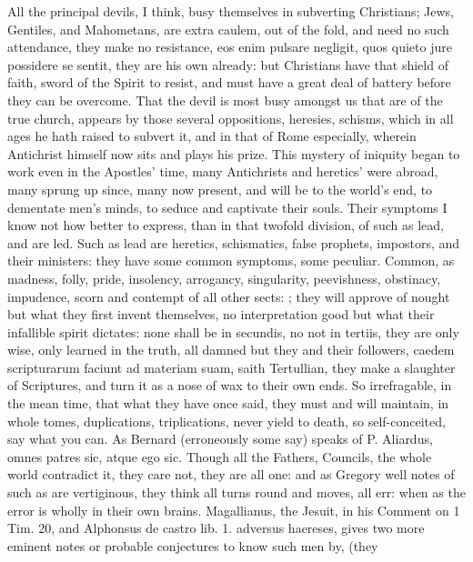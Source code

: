 {All the principal devils, I think, busy themselves in subverting
Christians; Jews, Gentiles, and Mahometans, are extra caulem, out of
the fold, and need no such attendance, they make no resistance,
eos enim pulsare negligit, quos quieto jure possidere se sentit,
they are his own already: but Christians have that shield of faith,
sword of the Spirit to resist, and must have a great deal of battery
before they can be overcome. That the devil is most busy amongst us
that are of the true church, appears by those several oppositions,
heresies, schisms, which in all ages he hath raised to subvert it, and
in that of Rome especially, wherein Antichrist himself now sits and
plays his prize. This mystery of iniquity began to work even in the
Apostles' time, many Antichrists and heretics' were abroad, many sprung
up since, many now present, and will be to the world's end, to
dementate men's minds, to seduce and captivate their souls. Their
symptoms I know not how better to express, than in that twofold
division, of such as lead, and are led. Such as lead are heretics,
schismatics, false prophets, impostors, and their ministers: they have
some common symptoms, some peculiar. Common, as madness, folly, pride,
insolency, arrogancy, singularity, peevishness, obstinacy, impudence,
scorn and contempt of all other sects: ; they will approve of nought but what they first invent
themselves, no interpretation good but what their infallible spirit
dictates: none shall be in secundis, no not in tertiis, they are only
wise, only learned in the truth, all damned but they and their
followers, caedem scripturarum faciunt ad materiam suam, saith
Tertullian, they make a slaughter of Scriptures, and turn it as a nose
of wax to their own ends. So irrefragable, in the mean time, that what
they have once said, they must and will maintain, in whole tomes,
duplications, triplications, never yield to death, so self-conceited,
say what you can. As Bernard (erroneously some say) speaks of P.
Aliardus, omnes patres sic, atque ego sic. Though all the Fathers,
Councils, the whole world contradict it, they care not, they are all
one: and as  Gregory well notes of such as are vertiginous, they
think all turns round and moves, all err: when as the error is wholly
in their own brains. Magallianus, the Jesuit, in his Comment on 1 Tim.
 20, and Alphonsus de castro lib. 1. adversus haereses, gives two
more eminent notes or probable conjectures to know such men by, (they
}
